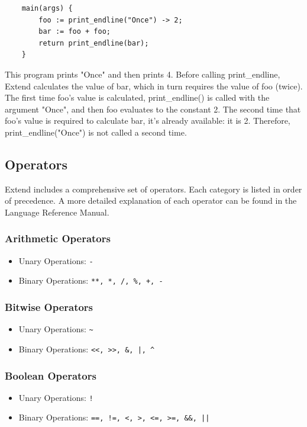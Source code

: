 	\begin{lstlisting}
	main(args) {
		foo := print_endline("Once") -> 2;
		bar := foo + foo;
		return print_endline(bar);
	}
	\end{lstlisting}

	\medskip \noindent
	This program prints "Once" and then prints 4. Before calling print\_endline, Extend calculates the value of bar, which in turn requires the value of foo (twice). The first time foo's value is calculated, print\_endline() is called with the argument "Once", and then foo evaluates to the constant 2. The second time that foo's value is required to calculate bar, it's already available: it is 2. Therefore, print\_endline("Once") is not called a second time.

	\subsection{Operators}
	Extend includes a comprehensive set of operators. Each category is listed in order of precedence. A more detailed explanation of each operator can be found in the Language Reference Manual.

		\subsubsection{Arithmetic Operators}
			\begin{itemize}
				\item Unary Operations: \texttt{-}
				\item Binary Operations: \texttt{**, *, /, \%, +, -}
			\end{itemize}

		\subsubsection{Bitwise Operators}
			\begin{itemize}
				\item Unary Operations: \texttt{\~}
				\item Binary Operations: \texttt{<<, >>, \&, |, \^}
			\end{itemize}

		\subsubsection{Boolean Operators}
			\begin{itemize}
				\item Unary Operations: \texttt{!}
				\item Binary Operations: \texttt{==, !=, <, >, <=, >=, \&\&, ||}
			\end{itemize}


